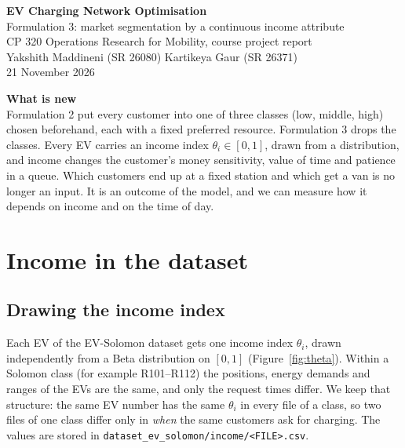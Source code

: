 \documentclass[11pt,a4paper]{article}
\begin{document}
\begin{center}
{\LARGE\bfseries\color{headblue} EV Charging Network Optimisation}\\[6pt]
{\large Formulation 3: market segmentation by a continuous income attribute}\\[4pt]
{\normalsize CP 320 Operations Research for Mobility, course project report}\\[2pt]
{\normalsize Yakshith Maddineni (SR 26080) \quad\textperiodcentered\quad Kartikeya Gaur (SR 26371)}\\[2pt]
{\normalsize 21 November 2026}
\end{center}

\begin{objbox}
{\color{headblue}\textbf{What is new}}\\
Formulation 2 put every customer into one of three classes (low, middle, high) chosen beforehand, each with a fixed preferred resource. Formulation 3 drops the classes. Every EV carries an income index $\theta_i\in[0,1]$, drawn from a distribution, and income changes the customer's money sensitivity, value of time and patience in a queue. Which customers end up at a fixed station and which get a van is no longer an input. It is an outcome of the model, and we can measure how it depends on income and on the time of day.
\end{objbox}



\section{Income in the dataset}

\subsection{Drawing the income index}

Each EV of the EV-Solomon dataset gets one income index $\theta_i$, drawn independently from a Beta distribution on $[0,1]$ (Figure~\ref{fig:theta}). Within a Solomon class (for example R101--R112) the positions, energy demands and ranges of the EVs are the same, and only the request times differ. We keep that structure: the same EV number has the same $\theta_i$ in every file of a class, so two files of one class differ only in \emph{when} the same customers ask for charging. The values are stored in \texttt{dataset\_ev\_solomon/income/<FILE>.csv}.
\end{document}
